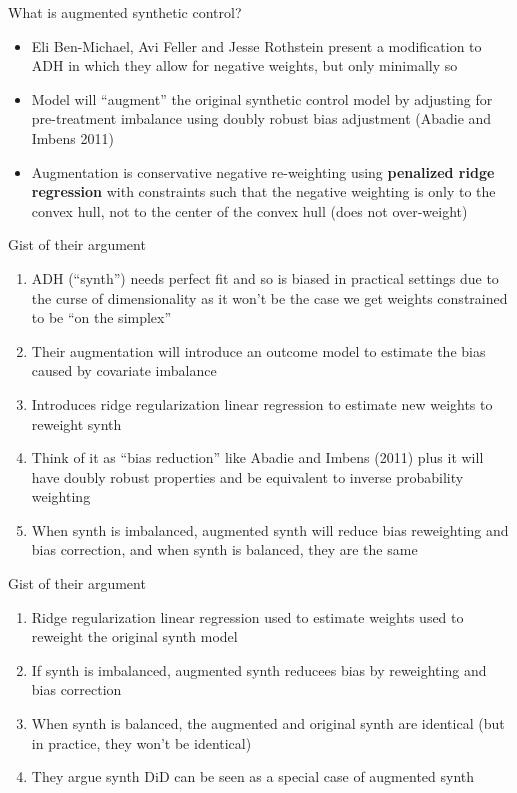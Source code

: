 \documentclass{beamer}
\begin{document}
\begin{frame}{What is augmented synthetic control?}

\begin{itemize}
\item Eli Ben-Michael, Avi Feller and Jesse Rothstein present a modification to ADH in which they allow for negative weights, but only minimally so
\item Model will ``augment'' the original synthetic control model by adjusting for pre-treatment imbalance using doubly robust bias adjustment (Abadie and Imbens 2011)
\item Augmentation is conservative negative re-weighting using \textbf{penalized ridge regression} with constraints such that the negative weighting is only to the convex hull, not to the center of the convex hull (does not over-weight)
\end{itemize}

\end{frame}




\begin{frame}{Gist of their argument}

\begin{enumerate}
\item ADH (``synth'') needs perfect fit and so is biased in practical settings due to the curse of dimensionality as it won't be the case we get weights constrained to be ``on the simplex''
\item Their augmentation will introduce an outcome model to estimate the bias caused by covariate imbalance 
\item Introduces ridge regularization linear regression to estimate new weights to reweight synth
\item Think of it as ``bias reduction'' like Abadie and Imbens (2011) plus it will have doubly robust properties and be equivalent to inverse probability weighting
\item When synth is imbalanced, augmented synth will reduce bias reweighting and bias correction, and when synth is balanced, they are the same
\end{enumerate}

\end{frame}


\begin{frame}{Gist of their argument}

\begin{enumerate}
\item Ridge regularization linear regression used to estimate weights used to reweight the original synth model
\item If synth is imbalanced, augmented synth reducees bias by reweighting and bias correction
\item When synth is balanced, the augmented and original synth are identical (but in practice, they won't be identical)
\item They argue synth DiD can be seen as a special case of augmented synth
\end{enumerate}

\end{frame}
\end{document}
